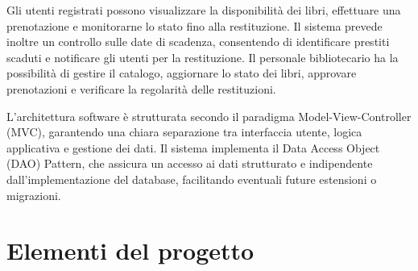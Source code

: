 \documentclass[twoside,openright,titlepage,fleqn,headinclude,12pt,a4paper,BCOR=5mm,footinclude]{scrbook}
\begin{document}
Gli utenti registrati possono visualizzare la disponibilità dei libri, effettuare una prenotazione e monitorarne lo stato fino alla restituzione. Il sistema prevede inoltre un controllo sulle date di scadenza, consentendo di identificare prestiti scaduti e notificare gli utenti per la restituzione. Il personale bibliotecario ha la possibilità di gestire il catalogo, aggiornare lo stato dei libri, approvare prenotazioni e verificare la regolarità delle restituzioni.

L’architettura software è strutturata secondo il paradigma Model-View-Controller (MVC), garantendo una chiara separazione tra interfaccia utente, logica applicativa e gestione dei dati. Il sistema implementa il Data Access Object (DAO) Pattern, che assicura un accesso ai dati strutturato e indipendente dall’implementazione del database, facilitando eventuali future estensioni o migrazioni. 


\section{Elementi del progetto}
\end{document}
